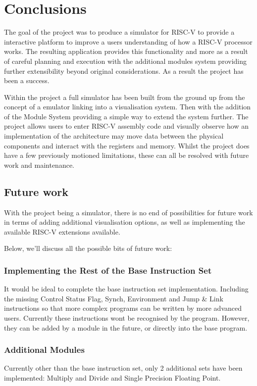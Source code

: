 \chapter{Conclusions}
\label{ch:conclusions}
The goal of the project was to produce a simulator for RISC-V \cite{riscv_2015_riscv} to provide a interactive platform to improve a users understanding of how a RISC-V processor works. The resulting application provides this functionality and more as a result of careful planning and execution with the additional modules system providing further extensibility beyond original considerations. As a result the project has been a success.

Within the project a full simulator has been built from the ground up from the concept of a emulator linking into a visualisation system. Then with the addition of the Module System providing a simple way to extend the system further. The project allows users to enter RISC-V \cite{riscv_2015_riscv} assembly code and visually observe how an implementation of the architecture may move data between the physical components and interact with the registers and memory. Whilst the project does have a few previously motioned limitations, these can all be resolved with future work and maintenance.

\section{Future work}\label{sec:future_work}
With the project being a simulator, there is no end of possibilities for future work in terms of adding additional visualisation options, as well as implementing the available RISC-V \cite{riscv_2015_riscv} extensions available.

Below, we'll discuss all the possible bits of future work:

\subsection{Implementing the Rest of the Base Instruction Set}
It would be ideal to complete the base instruction set implementation. Including the missing Control Status Flag, Synch, Environment and Jump \& Link instructions so that more complex programs can be written by more advanced users. Currently these instructions wont be recognised by the program. However, they can be added by a module in the future, or directly into the base program. 

\subsection{Additional Modules}
Currently other than the base instruction set, only 2 additional sets have been implemented: Multiply and Divide and Single Precision Floating Point. 

